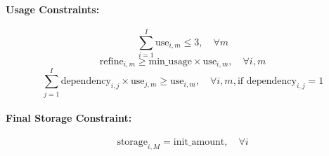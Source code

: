 \documentclass{article}
\begin{document}
\paragraph{Usage Constraints:}
\[
\sum_{i=1}^{I} \text{use}_{i,m} \leq 3, \quad \forall m
\]
\[
\text{refine}_{i,m} \geq \text{min\_usage} \times \text{use}_{i,m}, \quad \forall i, m
\]
\[
\sum_{j=1}^{I} \text{dependency}_{i,j} \times \text{use}_{j,m} \geq \text{use}_{i,m}, \quad \forall i, m, \text{if dependency}_{i,j} = 1
\]

\paragraph{Final Storage Constraint:}
\[
\text{storage}_{i,M} = \text{init\_amount}, \quad \forall i
\]
\end{document}
